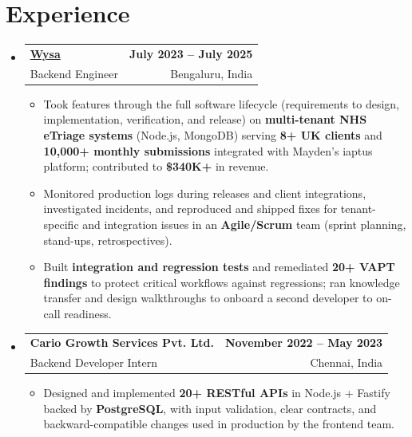 \documentclass[letterpaper,10pt]{article}
\makeatletter
\newcommand{\resumeItem}[1]{
  \item\small{#1\vspace{-1pt}}
}
\newcommand{\resumeSubheading}[4]{
  \vspace{1pt}\item
    \begin{tabular*}{0.985\textwidth}[t]{l@{\extracolsep{\fill}}r}
      \textbf{#1} & \textbf{\small #2} \\
      {\small\color{ResumeSlate} #3} & {\small\color{ResumeSlate} #4} \\
    \end{tabular*}\vspace{-6pt}
}
\newcommand{\resumeSubHeadingListStart}{\begin{itemize}[leftmargin=0.0in, label={}, itemsep=2pt, topsep=2pt]}
\newcommand{\resumeSubHeadingListEnd}{\end{itemize}}
\newcommand{\resumeItemListStart}{\begin{itemize}[leftmargin=0.18in, itemsep=2pt, topsep=1pt]}
\newcommand{\resumeItemListEnd}{\end{itemize}\vspace{-4pt}}
\makeatother
\begin{document}
\section{Experience}
\resumeSubHeadingListStart
  \resumeSubheading
    {\href{https://www.wysa.io}{Wysa}}{July 2023 -- July 2025}
    {Backend Engineer}{Bengaluru, India}
    \resumeItemListStart
      \resumeItem{Took features through the full software lifecycle (requirements to design, implementation, verification, and release) on \textbf{multi-tenant NHS eTriage systems} (Node.js, MongoDB) serving \textbf{8+ UK clients} and \textbf{10{,}000+ monthly submissions} integrated with Mayden's iaptus platform; contributed to \textbf{\$340K+} in revenue.}
      \resumeItem{Monitored production logs during releases and client integrations, investigated incidents, and reproduced and shipped fixes for tenant-specific and integration issues in an \textbf{Agile/Scrum} team (sprint planning, stand-ups, retrospectives).}
      \resumeItem{Built \textbf{integration and regression tests} and remediated \textbf{20+ VAPT findings} to protect critical workflows against regressions; ran knowledge transfer and design walkthroughs to onboard a second developer to on-call readiness.}
    \resumeItemListEnd
  \resumeSubheading
    {Cario Growth Services Pvt. Ltd.}{November 2022 -- May 2023}
    {Backend Developer Intern}{Chennai, India}
    \resumeItemListStart
      \resumeItem{Designed and implemented \textbf{20+ RESTful APIs} in Node.js + Fastify backed by \textbf{PostgreSQL}, with input validation, clear contracts, and backward-compatible changes used in production by the frontend team.}
    \resumeItemListEnd
\resumeSubHeadingListEnd
\vspace{-4pt}
\end{document}
